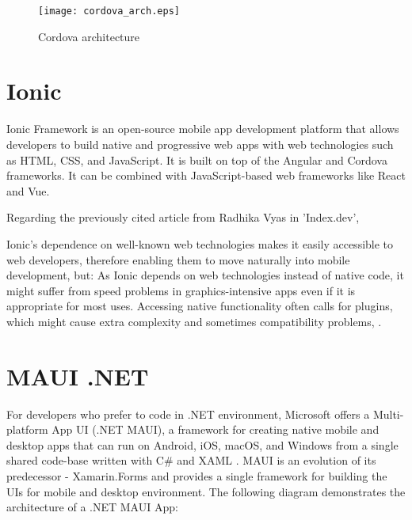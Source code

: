 \begin{figure}[H]
    \centering
    \texttt{[image: cordova\_arch.eps]}
    \caption[Cordova architecture]{\label{fig:cordova} Cordova architecture }
\end{figure}    
                
\section{{Ionic}}%
\label{sec:ionic}

Ionic Framework is an open-source mobile app development platform that allows developers to build native and progressive web apps with web technologies such as HTML, CSS, and JavaScript. It is built on top of the Angular and Cordova frameworks. It can be combined with JavaScript-based web frameworks like React and Vue.

Regarding the previously cited article from Radhika Vyas in 'Index.dev',
\begin{displayquote}
Ionic's dependence on well-known web technologies makes it easily accessible to web developers, therefore enabling them to move naturally into mobile development, but: \newline
    As Ionic depends on web technologies instead of native code, it might suffer from speed problems in graphics-intensive apps even if it is appropriate for most uses. Accessing native functionality often calls for plugins, which might cause extra complexity and sometimes compatibility problems, \textcite{Vyas}.
\end{displayquote}




\section{{MAUI .NET}}%
\label{sec:maui}

For developers who prefer to code in .NET environment, Microsoft offers a Multi-platform App UI (.NET MAUI), a framework for creating native mobile and desktop apps that can run on Android, iOS, macOS, and Windows from a single shared code-base written with C\# and XAML  \autocite{XAML} \autocite{MAUIDocs}. MAUI is an evolution of its predecessor - Xamarin.Forms \autocite{Xamarin} and provides a single framework for building the UIs for mobile and desktop environment. The following diagram demonstrates the architecture of a .NET MAUI App:

